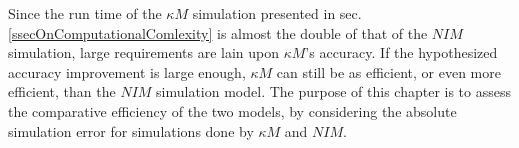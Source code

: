 \documentclass[b5paper,12 pt]{report}
\begin{document}
		Since the run time of the $\kappa M$ simulation presented in sec. \ref{ssecOnComputationalComlexity} is almost the double of that of the $NIM$ simulation, large requirements are lain upon $\kappa M$'s accuracy. %
		If the hypothesized accuracy improvement is large enough, $\kappa M$ can still be as efficient, or even more efficient, than the $NIM$ simulation model.
		The purpose of this chapter is to assess the comparative efficiency of the two models, by considering the absolute simulation error for simulations done by $\kappa M$ and $NIM$. %




% 

		
\end{document}
